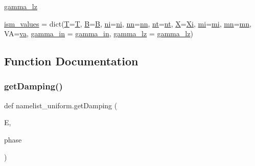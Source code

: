 \begin{DoxyCompactItemize}
\item 
\hyperlink{namespacenamelist__uniform_a4b63d21ea7738d582a08105f52f40def}{gamma\+\_\+lz}
\item 
\hyperlink{namespacenamelist__uniform_a51756e043c27348b4756d687c404e6ec}{ism\+\_\+values} = dict(\hyperlink{namespacenamelist__uniform_a6a573063926a6f17cbb2b3a31c43d4b9}{T}=\hyperlink{namespacenamelist__uniform_a6a573063926a6f17cbb2b3a31c43d4b9}{T}, \hyperlink{namespacenamelist__uniform_ae1690f9a9b42d7e25dcaf55bc0cf3740}{B}=\hyperlink{namespacenamelist__uniform_ae1690f9a9b42d7e25dcaf55bc0cf3740}{B}, \hyperlink{namespacenamelist__uniform_abee7e57b358b8573c75388c12f8861de}{ni}=\hyperlink{namespacenamelist__uniform_abee7e57b358b8573c75388c12f8861de}{ni}, \hyperlink{namespacenamelist__uniform_ac96703fb06a806a505e4c0806c6c0b90}{nn}=\hyperlink{namespacenamelist__uniform_ac96703fb06a806a505e4c0806c6c0b90}{nn}, \hyperlink{namespacenamelist__uniform_a198cbd74a3e91796f8f3cbd9fdb199f1}{nt}=\hyperlink{namespacenamelist__uniform_a198cbd74a3e91796f8f3cbd9fdb199f1}{nt}, \hyperlink{namespacenamelist__uniform_ac57abe57ed039db9d3b98a9a732ae972}{X}=\hyperlink{namespacenamelist__uniform_a48241844a7bc005dc5c89b8d45c53246}{Xi}, \hyperlink{namespacenamelist__uniform_a7972f9ba50f29023481fb7b0f3f10646}{mi}=\hyperlink{namespacenamelist__uniform_a7972f9ba50f29023481fb7b0f3f10646}{mi}, \hyperlink{namespacenamelist__uniform_a5fe816528182a7927c9158e29b3378eb}{mn}=\hyperlink{namespacenamelist__uniform_a5fe816528182a7927c9158e29b3378eb}{mn}, VA=\hyperlink{namespacenamelist__uniform_a2da183365c60c169afce9cf3b47d7d9b}{va}, \hyperlink{namespacenamelist__uniform_a425da3c0d76b3fa25d85e1160319346f}{gamma\+\_\+in} = \hyperlink{namespacenamelist__uniform_a425da3c0d76b3fa25d85e1160319346f}{gamma\+\_\+in}, \hyperlink{namespacenamelist__uniform_a4b63d21ea7738d582a08105f52f40def}{gamma\+\_\+lz} = \hyperlink{namespacenamelist__uniform_a4b63d21ea7738d582a08105f52f40def}{gamma\+\_\+lz})
\end{DoxyCompactItemize}


\subsection{Function Documentation}
\mbox{\label{namespacenamelist__uniform_aad345e2665220260c1a54980166d06af}} 
\subsubsection{\texorpdfstring{get\+Damping()}{getDamping()}}
{\footnotesize\ttfamily def namelist\+\_\+uniform.\+get\+Damping (\begin{DoxyParamCaption}\item[{}]{E,  }\item[{}]{phase }\end{DoxyParamCaption})}

